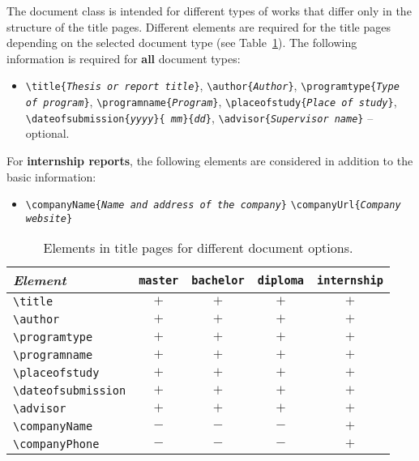 The document class is intended for different types of works that differ only in
the structure of the title pages. Different elements are required for the title
pages depending on the selected document type (see
Table~\ref{tab:TitleElements}). The following information is required for
\textbf{all} document types:
%
\begin{itemize}
    \item[] %
    \verb!\title{!\texttt{\em Thesis or report title}\verb!}!, \newline%
    \verb!\author{!\texttt{\em Author}\verb!}!, \newline%
    \verb!\programtype{!\texttt{\em Type of program}\verb!}!, \newline%
    \verb!\programname{!\texttt{\em Program}\verb!}!, \newline%
    \verb!\placeofstudy{!\texttt{\em Place of study}\verb!}!, \newline%
    \verb!\dateofsubmission{!\texttt{\em yyyy}\verb!}{!\texttt{\em
    mm}\verb!}{!\texttt{\em dd}\verb!}!, \newline%
    \verb!\advisor{!\texttt{\em Supervisor name}\verb!}! --
    optional.
\end{itemize}
%
\noindent
For \textbf{internship reports}, the following elements are considered in
addition to the basic information:
%
\begin{itemize}
    \item[] %
    \verb!\companyName{!\texttt{\em Name and address of the company}\verb!}!
    \newline%
    \verb!\companyUrl{!\texttt{\em Company website}\verb!}!
\end{itemize}

\begin{table}
    \caption{Elements in title pages for different document options.}
    \label{tab:TitleElements}
    \centering\small
    \begin{tabular}{@{}lcccc@{}}
        \toprule
        \emph{Element} & \texttt{master} & \texttt{bachelor} & 
				\texttt{diploma} & \texttt{internship} \\
        \midrule
        \verb!\title!            & $+$ & $+$ & $+$ & $+$ \\
        \verb!\author!           & $+$ & $+$ & $+$ & $+$ \\
        \verb!\programtype!      & $+$ & $+$ & $+$ & $+$ \\
        \verb!\programname!      & $+$ & $+$ & $+$ & $+$ \\
        \verb!\placeofstudy!     & $+$ & $+$ & $+$ & $+$ \\
        \verb!\dateofsubmission! & $+$ & $+$ & $+$ & $+$ \\
        \verb!\advisor!          & $+$ & $+$ & $+$ & $+$ \\
        \verb!\companyName!      & $-$ & $-$ & $-$ & $+$ \\
        \verb!\companyPhone!     & $-$ & $-$ & $-$ & $+$ \\
        \bottomrule
    \end{tabular}
\end{table}

